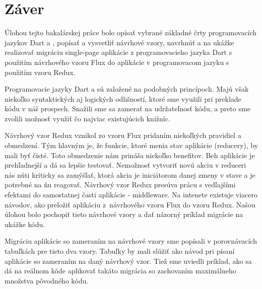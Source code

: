 \chapter*{Záver}  %

Úlohou tejto bakalárskej práce bolo opísať vybrané základné črty programovacích jazykov Dart a \JS{}, popísať a vysvetliť návrhové vzory, navrhnúť a na ukážke realizovať migráciu single-page aplikácie z programovacieho jazyka Dart s použitím návrhového vzoru Flux do aplikácie v programovacom jazyku \JS{} s použitím vzoru Redux.

Programovacie jazyky Dart a \JS{} sú založené na podobných princípoch. Majú však niekoľko syntaktických aj logických odlišností, ktoré sme využili pri preklade kódu v náš prospech. Snažili sme sa zamerať na udržateľnosť kódu, a preto sme zvolili možnosť využiť čo najviac existujúcich knižníc.

Návrhový vzor Redux vznikol zo vzoru Flux pridaním niekoľkých pravidiel a obmedzení. Tým hlavným je, že funkcie, ktoré menia stav aplikácie (reducery), by mali byť čisté. Toto obmedzenie nám prináša niekoľko benefitov.
Beh aplikácie je prehľadnejší a dá sa lepšie testovať.
Nemožnosť vytvoriť novú akciu v reduceri nás núti kriticky sa zamýšľať, ktorá akcia je iniciátorom danej zmeny v stave a je potrebné na ňu reagovať. 
Návrhový vzor Redux presúva prácu s vedľajšími efektami do samostatnej časti aplikácie - middleware. 
Na intenete existuje viacero návodov, ako preložiť aplikáciu z~návrhového vzoru Flux do vzoru Redux. Našou úlohou bolo pochopiť tieto návrhové vzory a dať názorný príklad migrácie na ukážke kódu.

Migráciu aplikácie so zameraním na návrhové vzory sme popísali v porovnávacích tabuľkách pre tieto dva vzory. Tabuľky by mali slúžiť ako návod pri písaní aplikácie so zameraním na daný návrhový vzor. Tiež sme uviedli príklad, ako sa dá na reálnom kóde aplikovať takáto migrácia so zachovaním maximálneho množstva pôvodného kódu.


